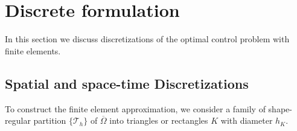 \documentclass{amsart}
\begin{document}
\section{Discrete formulation}\label{Discrete formulation}
In this section we discuss discretizations of the optimal control problem with finite elements. %

\subsection{Spatial and space-time Discretizations}
To construct the finite element approximation, we consider a family of shape-regular partition $\{\mathcal{T}_h\}$ of $\overline{\Omega}$ into triangles or rectangles $K$ with diameter $h_K$. 
\end{document}
